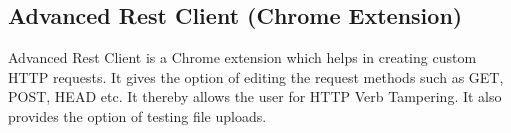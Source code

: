 \subsection{Advanced Rest Client (Chrome Extension)}
Advanced Rest Client is a Chrome extension which helps in creating custom HTTP requests. It gives the option of editing the request methods such as GET, POST, HEAD etc. It thereby allows the user for HTTP Verb Tampering. It also provides the option of testing file uploads.